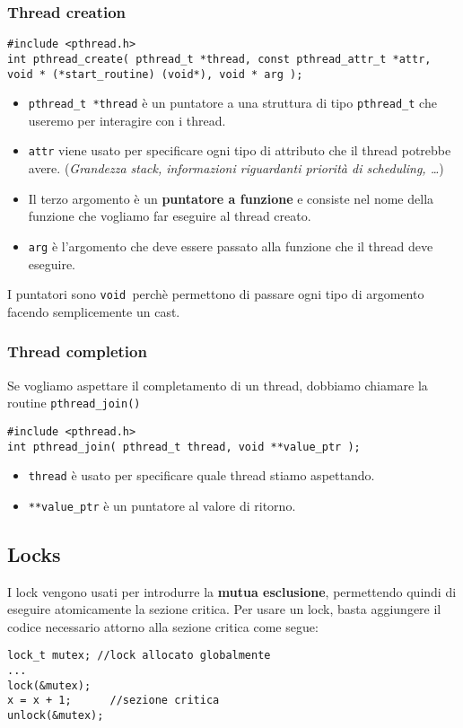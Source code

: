 \documentclass[12pt, letterpaper]{article}
\begin{document}
			\subsubsection{Thread creation}
				\begin{lstlisting}[style=CStyle]
#include <pthread.h>
int pthread_create( pthread_t *thread, const pthread_attr_t *attr, void * (*start_routine) (void*), void * arg ); \end{lstlisting}
				
				\begin{itemize}
					\item \texttt{pthread\_t *thread} è un puntatore a una struttura di tipo \texttt{pthread\_t} che useremo per interagire con i thread.
					\item \texttt{attr} viene usato per specificare ogni tipo di attributo che il thread potrebbe avere. (\textit{Grandezza stack, informazioni riguardanti priorità di scheduling, \dots})
					\item Il terzo argomento è un \textbf{puntatore a funzione} e consiste nel nome della funzione che vogliamo far eseguire al thread creato.
					\item \texttt{arg} è l’argomento che deve essere passato alla funzione che il thread deve eseguire.
				\end{itemize}
				
				I puntatori sono \texttt{void }perchè permettono di passare ogni tipo di argomento facendo semplicemente un cast.
		
			\subsubsection{Thread completion}
				Se vogliamo aspettare il completamento di un thread, dobbiamo chiamare la routine \texttt{pthread\_join()}
				\begin{lstlisting}[style=CStyle]
#include <pthread.h>
int pthread_join( pthread_t thread, void **value_ptr ); \end{lstlisting}
				\begin{itemize}
					\item \texttt{thread} è usato per specificare quale thread stiamo aspettando.
					\item \texttt{**value\_ptr} è un puntatore al valore di ritorno.
				\end{itemize}

				
		\subsection{Locks}
			I lock vengono usati per introdurre la \textbf{mutua esclusione}, permettendo quindi di eseguire atomicamente la sezione critica. Per usare un lock, basta aggiungere il codice necessario attorno alla sezione critica come segue:
			\begin{lstlisting}[style=CStyle]
lock_t mutex; //lock allocato globalmente
...
lock(&mutex);
x = x + 1; 		//sezione critica
unlock(&mutex); \end{lstlisting}				
			
\end{document}
